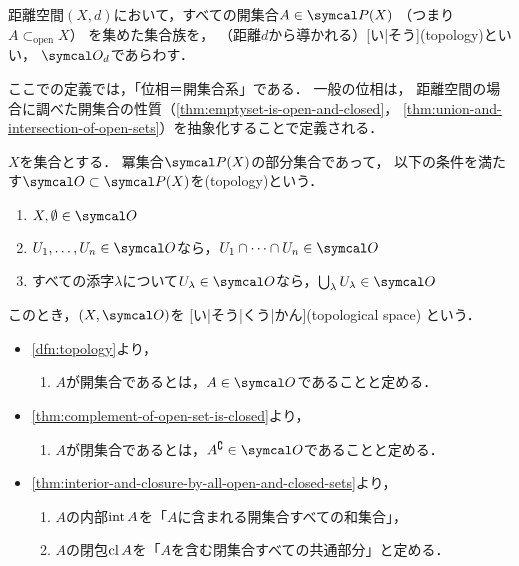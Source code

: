 \documentclass[../sotsu.tex]{subfiles}
\begin{document}
\begin{definition}[距離位相]
    \label{dfn:topology-by-distance}
    距離空間$(X, d)$において，すべての開集合$A \in \pset(X)$
    （つまり$A \subset_{\text{open}} X$）
    を集めた集合族を，
    （距離$d$から導かれる）[い|そう](topology)といい，
    $\topology_d$であらわす．
\end{definition}

ここでの定義では，「位相＝開集合系」である．
一般の位相は，
距離空間の場合に調べた開集合の性質（\cref{thm:emptyset-is-open-and-closed}，
\cref{thm:union-and-intersection-of-open-sets}）を抽象化することで定義される．

\begin{definition}[位相]
    \label{dfn:topology}
    \label{dfn:topological-space}
    $X$を集合とする．
    冪集合$\pset(X)$の部分集合であって，
    以下の条件を満たす$\topology \subset \pset(X)$を(topology)という．
    \begin{enumerate}
        \item $X, \emptyset \in \topology$
        \item $U_1, \dots, U_n \in \topology$なら，$U_1 \cap \dots \cap U_n \in \topology$
        \item すべての添字$\lambda$について$U_\lambda \in \topology$なら，$\bigcup_{\lambda} U_\lambda \in \topology$
    \end{enumerate}
    このとき，$(X, \topology)$を%
    [い|そう|くう|かん](topological space)%
    という．
\end{definition}


\begin{itemize}
    \item \cref{dfn:topology}より，
    \begin{enumerate}
        \item $A$が開集合であるとは，$A \in \topology$であることと定める．
    \end{enumerate}

    \item \cref{thm:complement-of-open-set-is-closed}より，
    \begin{enumerate}[resume]
        \item $A$が閉集合であるとは，$A^\complement \in \topology$であることと定める．
    \end{enumerate}

    \item \cref{thm:interior-and-closure-by-all-open-and-closed-sets}より，
    \begin{enumerate}[resume]
        \item $A$の内部$\operatorname{int}{A}$を「$A$に含まれる開集合すべての和集合」，
        \item $A$の閉包$\operatorname{cl}{A}$を「$A$を含む閉集合すべての共通部分」と定める．
    \end{enumerate}
\end{itemize}
\end{document}
